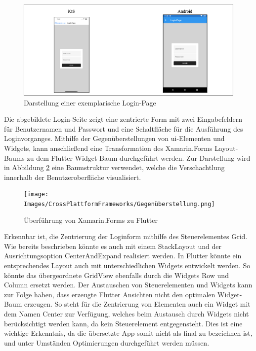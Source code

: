 \begin{figure}[!ht]
 \includegraphics[width=\textwidth,height=\textheight,keepaspectratio]{Images/CrossPlattformFrameworks/ExamplePage.png}
 \caption{Darstellung einer exemplarische Login-Page}
 \label{fig:ExamplePage}
\end{figure}

Die abgebildete Login-Seite zeigt eine zentrierte Form mit zwei Eingabefeldern für Benutzernamen und Passwort und eine Schaltfläche für die Ausführung des Loginvorganges.  Mithilfe der Gegenüberstellungen von \ac{ui}-Elementen und Widgets,  kann anschließend eine Transformation des Xamarin.Forms Layout-Baums zu dem Flutter Widget Baum durchgeführt werden.  Zur Darstellung wird in Abbildung \ref{fig:LayoutTree} eine Baumstruktur verwendet,  welche die Verschachtlung innerhalb der Benutzeroberfläche visualisiert.  
\begin{figure}[!ht]
 \texttt{[image: Images/CrossPlattformFrameworks/Gegenüberstellung.png]}
 \caption{Überführung von Xamarin.Forms zu Flutter}
 \label{fig:LayoutTree}
\end{figure}

Erkennbar ist,  die Zentrierung der Loginform mithilfe des Steuerelementes \glq Grid\grq{}.  Wie bereits beschrieben könnte es auch mit einem \glq StackLayout\grq{} und der Ausrichtungsoption \glq CenterAndExpand\grq{} realisiert werden.  In Flutter könnte ein entsprechendes Layout auch mit unterschiedlichen Widgets entwickelt werden.  So könnte das übergeordnete \glq GridView \grq{}ebenfalls durch die Widgets \glq Row\grq{} und \glq Column\grq{} ersetzt werden.  Der Austauschen von Steuerelementen und Widgets kann zur Folge haben,  dass erzeugte Flutter Ansichten nicht den optimalen Widget-Baum erzeugen.  So steht für die Zentrierung von Elementen auch ein Widget mit dem Namen \glq Center\grq{}  zur Verfügung,  welches beim Austausch durch Widgets nicht berücksichtigt werden kann, da kein Steuerelement entgegensteht.  Dies ist eine wichtige Erkenntnis,  da die übersetzte App somit nicht als final zu bezeichnen ist, und unter Umständen Optimierungen durchgeführt werden müssen. 

